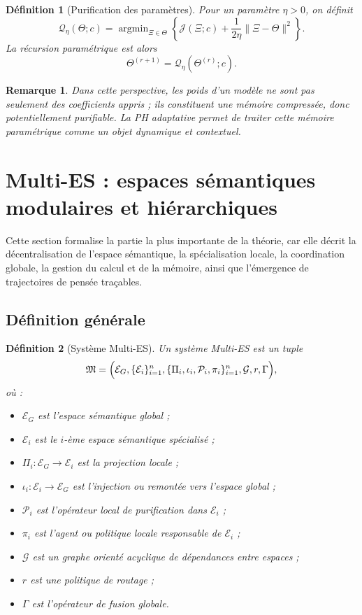 \documentclass[11pt,a4paper]{article}
\newtheorem{definition}{Définition}[section]
\newtheorem{remark}{Remarque}[section]
\DeclareMathOperator{\argmin}{argmin}
\newcommand{\E}{\mathcal E}
\newcommand{\Pcal}{\mathcal P}
\newcommand{\Qcal}{\mathcal Q}
\newcommand{\Gcal}{\mathcal G}
\newcommand{\1}{\mathbf 1}
\begin{document}
\begin{definition}[Purification des paramètres]
Pour un paramètre \(\eta>0\), on définit
\[
\Qcal_\eta(\Theta;c)
=
\argmin_{\Xi\in\Theta}
\left\{
\mathcal J(\Xi;c)
+
\frac{1}{2\eta}\|\Xi-\Theta\|^2
\right\}.
\]
La récursion paramétrique est alors
\[
\Theta^{(r+1)} = \Qcal_\eta(\Theta^{(r)};c).
\]
\end{definition}

\begin{remark}
Dans cette perspective, les poids d'un modèle ne sont pas seulement des coefficients appris ; ils constituent une mémoire compressée, donc potentiellement purifiable. La PH adaptative permet de traiter cette mémoire paramétrique comme un objet dynamique et contextuel.
\end{remark}

\section{Multi-ES : espaces sémantiques modulaires et hiérarchiques}

Cette section formalise la partie la plus importante de la théorie, car elle décrit la décentralisation de l'espace sémantique, la spécialisation locale, la coordination globale, la gestion du calcul et de la mémoire, ainsi que l'émergence de trajectoires de pensée traçables.

\subsection{Définition générale}

\begin{definition}[Système Multi-ES]
Un système Multi-ES est un tuple
\[
\mathfrak M
=
\Bigl(
\E_G,
\{\E_i\}_{i=1}^n,
\{\Pi_i,\iota_i,\Pcal_i,\pi_i\}_{i=1}^n,
\Gcal,
r,
\Gamma
\Bigr),
\]
où :

\begin{itemize}[leftmargin=2em]
    \item \(\E_G\) est l'espace sémantique global ;
    \item \(\E_i\) est le \(i\)-ème espace sémantique spécialisé ;
    \item \(\Pi_i:\E_G\to\E_i\) est la projection locale ;
    \item \(\iota_i:\E_i\to\E_G\) est l'injection ou remontée vers l'espace global ;
    \item \(\Pcal_i\) est l'opérateur local de purification dans \(\E_i\) ;
    \item \(\pi_i\) est l'agent ou politique locale responsable de \(\E_i\) ;
    \item \(\Gcal\) est un graphe orienté acyclique de dépendances entre espaces ;
    \item \(r\) est une politique de routage ;
    \item \(\Gamma\) est l'opérateur de fusion globale.
\end{itemize}
\end{definition}
\end{document}
